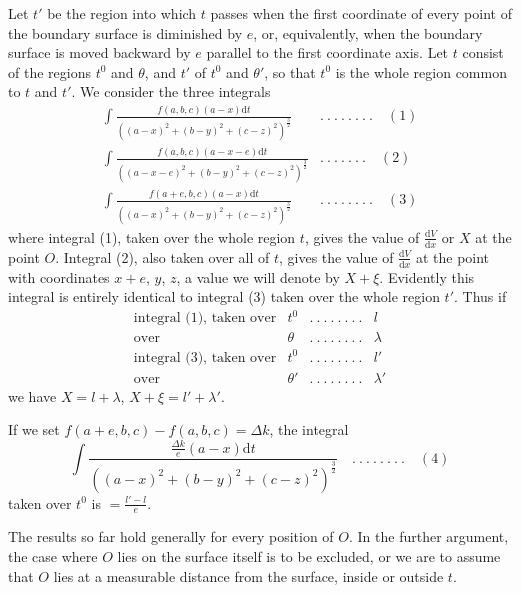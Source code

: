 Let $t'$ be the region into which $t$ passes when the first coordinate of every point of the boundary surface is diminished by $e$, or, equivalently, when the boundary surface is moved backward by $e$ parallel to the first coordinate axis. Let $t$ consist of the regions $t^0$ and $\theta$, and $t'$ of $t^0$ and $\theta'$, so that $t^0$ is the whole region common to $t$ and $t'$. We consider the three integrals
\[
\begin{array}{ll}
\displaystyle\int\frac{f(a,b,c)(a-x)\mathrm{d}t}{((a-x)^2+(b-y)^2+(c-z)^2)^{\frac{3}{2}}}&.\ .\ .\ .\ .\ .\ .\ .\quad(1)\\[8pt]
\displaystyle\int\frac{f(a,b,c)(a-x-e)\mathrm{d}t}{((a-x-e)^2+(b-y)^2+(c-z)^2)^{\frac{3}{2}}}&.\ .\ .\ .\ .\ .\ .\quad(2)\\[8pt]
\displaystyle\int\frac{f(a+e,b,c)(a-x)\mathrm{d}t}{((a-x)^2+(b-y)^2+(c-z)^2)^{\frac{3}{2}}}&.\ .\ .\ .\ .\ .\ .\ .\quad(3)
\end{array}
\]
where integral (1), taken over the whole region $t$, gives the value of $\frac{\mathrm{d}V}{\mathrm{d}x}$ or $X$ at the point $O$. Integral (2), also taken over all of $t$, gives the value of $\frac{\mathrm{d}V}{\mathrm{d}x}$ at the point with coordinates $x+e$, $y$, $z$, a value we will denote by $X+\xi$. Evidently this integral is entirely identical to integral (3) taken over the whole region $t'$. Thus if
%
\[
\begin{array}{rlcl}
\text{integral (1), taken over}&t^0&.\ .\ .\ .\ .\ .\ .\ .&l\\
\text{over}&\theta&.\ .\ .\ .\ .\ .\ .\ .&\lambda\\
\text{integral (3), taken over}&t^0&.\ .\ .\ .\ .\ .\ .\ .&l'\\
\text{over}&\theta'&.\ .\ .\ .\ .\ .\ .\ .&\lambda'
\end{array}
\]
we have $X=l+\lambda$, $X+\xi=l'+\lambda'$.

If we set $f(a+e,b,c)-f(a,b,c)=\Delta k$, the integral
\[
\int\frac{\frac{\Delta k}{e}(a-x)\mathrm{d}t}{((a-x)^2+(b-y)^2+(c-z)^2)^{\frac{3}{2}}}\quad .\ .\ .\ .\ .\ .\ .\ .\quad(4)
\]
taken over $t^0$ is $=\frac{l'-l}{e}$.

The results so far hold generally for every position of $O$. In the further argument, the case where $O$ lies on the surface itself is to be excluded, or we are to assume that $O$ lies at a measurable distance from the surface, inside or outside $t$.

